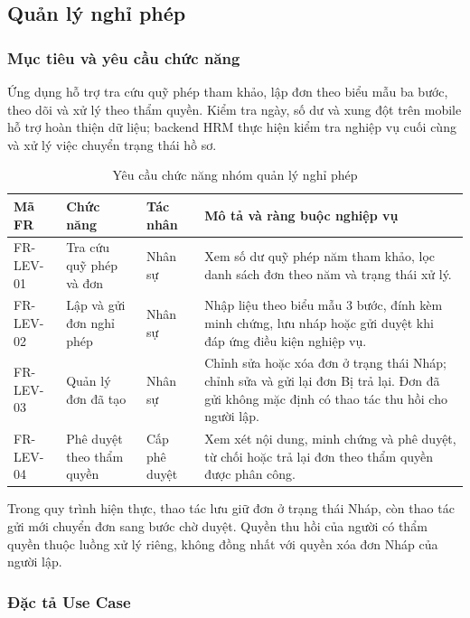 \subsection{Quản lý nghỉ phép}
\label{subsec:req_leave}
\label{subsec:module_leave}

\subsubsection{Mục tiêu và yêu cầu chức năng}

Ứng dụng hỗ trợ tra cứu quỹ phép tham khảo, lập đơn theo biểu mẫu ba bước, theo dõi và xử lý theo thẩm quyền. Kiểm tra ngày, số dư và xung đột trên mobile hỗ trợ hoàn thiện dữ liệu; backend HRM thực hiện kiểm tra nghiệp vụ cuối cùng và xử lý việc chuyển trạng thái hồ sơ.

\begin{table}[H]
\centering
\small
\caption{Yêu cầu chức năng nhóm quản lý nghỉ phép}
\label{tab:fr_leave}
\begin{tabularx}{\textwidth}{|L{1.8cm}|L{3.5cm}|L{2.5cm}|Y|}
\hline
\textbf{Mã FR} & \textbf{Chức năng} & \textbf{Tác nhân} & \textbf{Mô tả và ràng buộc nghiệp vụ} \\
\hline
FR-LEV-01 & Tra cứu quỹ phép và đơn & Nhân sự & Xem số dư quỹ phép năm tham khảo, lọc danh sách đơn theo năm và trạng thái xử lý. \\
\hline
FR-LEV-02 & Lập và gửi đơn nghỉ phép & Nhân sự & Nhập liệu theo biểu mẫu 3 bước, đính kèm minh chứng, lưu nháp hoặc gửi duyệt khi đáp ứng điều kiện nghiệp vụ. \\
\hline
FR-LEV-03 & Quản lý đơn đã tạo & Nhân sự & Chỉnh sửa hoặc xóa đơn ở trạng thái Nháp; chỉnh sửa và gửi lại đơn Bị trả lại. Đơn đã gửi không mặc định có thao tác thu hồi cho người lập. \\
\hline
FR-LEV-04 & Phê duyệt theo thẩm quyền & Cấp phê duyệt & Xem xét nội dung, minh chứng và phê duyệt, từ chối hoặc trả lại đơn theo thẩm quyền được phân công. \\
\hline
\end{tabularx}
\end{table}

Trong quy trình hiện thực, thao tác lưu giữ đơn ở trạng thái Nháp, còn thao tác gửi mới chuyển đơn sang bước chờ duyệt. Quyền thu hồi của người có thẩm quyền thuộc luồng xử lý riêng, không đồng nhất với quyền xóa đơn Nháp của người lập.

\subsubsection{Đặc tả Use Case}

